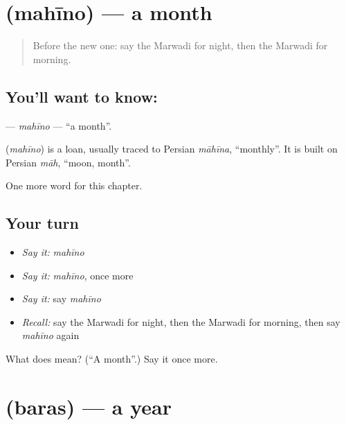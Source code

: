 \section[\texorpdfstring{\mw{महीनो} (mahīno)}{महीनो (mahīno)}]{ (mahīno) — a month}

\label{lesson:MW-C78-mahino}



\begin{quote}
Before the new one: say the Marwadi for night, then the Marwadi for morning.
\end{quote}

\subsection*{You'll want to know: }
\textbf{} — \emph{mahīno} — \textquotedblleft{}a month\textquotedblright{}.

\begin{cousinweb}
\textbf{} (\emph{mahīno}) is a loan, usually traced to Persian \emph{māhīna}, \textquotedblleft{}monthly\textquotedblright{}. It is built on Persian \emph{māh}, \textquotedblleft{}moon, month\textquotedblright{}.
\end{cousinweb}

\begin{grammarlens}[title={What you've built}]
One more word for this chapter.
\end{grammarlens}

\subsection*{Your turn}
\begin{itemize}
\raggedright
  \item \emph{Say it:} \emph{mahīno}
  \item \emph{Say it:} \emph{mahīno}, once more
  \item \emph{Say it:} say \emph{mahīno}
  \item \emph{Recall:} say the Marwadi for night, then the Marwadi for morning, then say \emph{mahīno} again
\end{itemize}

\begin{tcolorbox}[breakable,colback=teal!4,colframe=teal!35!black,title={Before you move on}]
What does  mean? (\textquotedblleft{}A month\textquotedblright{}.) Say it once more.
\end{tcolorbox}
\section[\texorpdfstring{\mw{बरस} (baras)}{बरस (baras)}]{ (baras) — a year}

